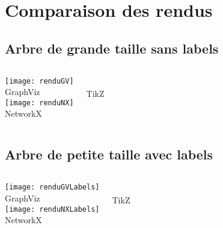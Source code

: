 \section{Comparaison des rendus}

\subsection{Arbre de grande taille sans labels}
\begin{frame}
\begin{columns}[t]
\centering
\texttt{[image: renduGV]}\\ %
GraphViz \\
\texttt{[image: renduNX]}\\
NetworkX %
\centering
{}\\ %
TikZ\\
\end{columns}
\end{frame}

\subsection{Arbre de petite taille avec labels}
\begin{frame}
\begin{columns}[t]
\centering
\texttt{[image: renduGVLabels]}\\ %
GraphViz\\
\texttt{[image: renduNXLabels]}\\ %
NetworkX
\centering
{}\\ %
TikZ\\
\end{columns}
\end{frame}